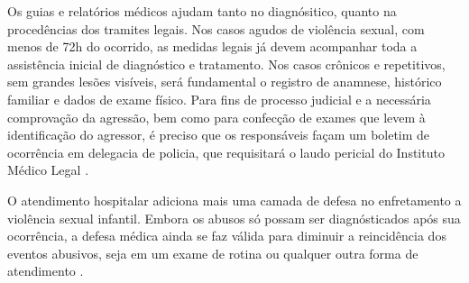 

Os guias e relatórios médicos ajudam tanto no diagnósitico, quanto na procedências dos tramites legais. Nos casos agudos de violência sexual, com menos de 72h do ocorrido, as medidas legais já devem acompanhar toda a assistência inicial de diagnóstico e tratamento. Nos casos crônicos e repetitivos, sem grandes lesões visíveis, será fundamental o registro de anamnese, histórico familiar e dados de exame físico. Para fins de processo judicial e a necessária comprovação da agressão, bem como para confecção de exames que levem à identificação do agressor, é preciso que os responsáveis façam um boletim de ocorrência em delegacia de policia, que requisitará o laudo pericial do Instituto Médico Legal \cite{de2012violencia}. 

O atendimento hospitalar adiciona mais uma camada de defesa no enfretamento a violência sexual infantil. Embora os abusos só possam ser diagnósticados após sua ocorrência, a defesa médica ainda se faz válida para diminuir a reincidência dos eventos abusivos, seja em um exame de rotina ou qualquer outra forma de atendimento \cite{costa2019maus}.




